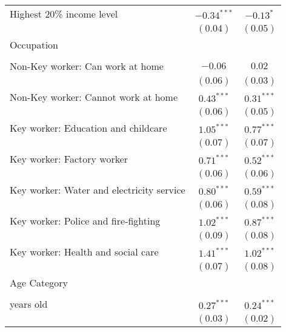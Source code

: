 \begin{table}
\begin{center}
\begin{scriptsize}
\begin{tabular}{l c c}
\quad Highest 20\% income level                 & $-0.34^{***}$ & $-0.13^{*}$   \\
                                                & $(0.04)$      & $(0.05)$      \\
Occupation                                      &               &               \\
                                                &               &               \\
\quad Non-Key worker: Can work at home          & $-0.06$       & $0.02$        \\
                                                & $(0.06)$      & $(0.03)$      \\
\quad Non-Key worker: Cannot work at home       & $0.43^{***}$  & $0.31^{***}$  \\
                                                & $(0.06)$      & $(0.05)$      \\
\quad Key worker: Education and childcare       & $1.05^{***}$  & $0.77^{***}$  \\
                                                & $(0.07)$      & $(0.07)$      \\
\quad Key worker: Factory worker                & $0.71^{***}$  & $0.52^{***}$  \\
                                                & $(0.06)$      & $(0.06)$      \\
\quad Key worker: Water and electricity service & $0.80^{***}$  & $0.59^{***}$  \\
                                                & $(0.06)$      & $(0.08)$      \\
\quad Key worker: Police and fire-fighting      & $1.02^{***}$  & $0.87^{***}$  \\
                                                & $(0.09)$      & $(0.08)$      \\
\quad Key worker: Health and social care        & $1.41^{***}$  & $1.02^{***}$  \\
                                                & $(0.07)$      & $(0.08)$      \\
Age Category                                    &               &               \\
                                                &               &               \\
\quad 40 years old                              & $0.27^{***}$  & $0.24^{***}$  \\
                                                & $(0.03)$      & $(0.02)$      \\

\end{tabular}
\end{scriptsize}
\end{center}
\end{table}
